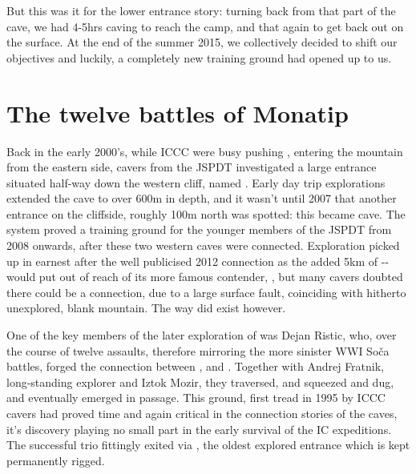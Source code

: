 But this was it for the lower entrance story: turning back from that part of the cave, we had 4-5hrs caving to reach the camp, and that again to get back out on the surface. At the end of the summer 2015, we collectively decided to shift our objectives and luckily, a completely new training ground had opened up to us.

\section{The twelve battles of Monatip}
Back in the early 2000’s, while ICCC were busy pushing , entering the mountain from the eastern side, cavers from the JSPDT investigated a large entrance situated half-way down the western cliff, named . Early day trip explorations extended the cave to over 600m in depth, and it wasn’t until 2007 that another entrance  on the cliffside, roughly 100m north was spotted: this became  cave. The system proved a training ground for the younger members of the JSPDT from 2008 onwards, after these two western caves were connected. Exploration picked up in earnest after the well publicised 2012 connection as the added 5km of -- would put  out of reach of its more famous contender, , but many cavers doubted there could be a connection, due to a large surface fault, coinciding with hitherto unexplored, blank mountain. The way did exist however.

One of the key members of the later exploration of  was Dejan Ristic, who, over the course of twelve assaults, therefore mirroring the more sinister WWI Soča battles, forged the connection between , and . Together with Andrej Fratnik, long-standing  explorer and Iztok Mozir, they traversed, and squeezed and dug, and eventually emerged in  passage. This ground, first tread in 1995 by ICCC cavers had proved time and again critical in the connection stories of the caves, it’s discovery playing no small part in the early survival of the IC expeditions. The successful trio fittingly exited via , the oldest explored entrance which is kept permanently rigged.


